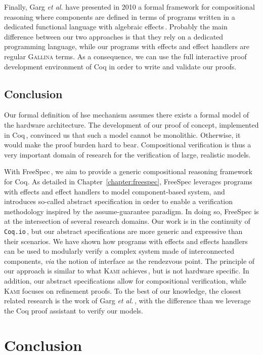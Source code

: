 Finally, Garg \emph{et al.} have presented in 2010 a formal framework for
compositional reasoning where components are defined in terms of programs
written in a dedicated functional language with algebraic
effects\,\cite{garg2010compositional}.
%
Probably the main difference between our two approaches is that they rely on a
dedicated programming language, while our programs with effects and effect
handlers are regular {\scshape Gallina} terms.
%
As a consequence, we can use the full interactive proof development environment
of Coq in order to write and validate our proofs.

\subsection{Conclusion}
\label{subsec:sota:compconclu}

Our formal definition of \ac{hse} mechanism assumes there exists a formal model
of the hardware architecture.
%
The development of our proof of concept, implemented in
Coq\,\cite{letan2016speccertcode}, convinced us that such a model cannot be
monolithic.
%
Otherwise, it would make the proof burden hard to bear.
%
Compositional verification is thus a very important domain of research for the
verification of large, realistic models.

With FreeSpec\,\cite{letan2018freespeccode}, we aim to provide a generic
compositional reasoning framework for Coq.
%
As detailed in Chapter~\ref{chapter:freespec}, FreeSpec leverages programs with
effects and effect handlers to model component-based system, and introduces
so-called abstract specification in order to enable a verification methodology
inspired by the assume-guarantee paradigm.
%
In doing so, FreeSpec is at the intersection of several research domains.
%
Our work is in the continuity of \texttt{Coq.io}\,\cite{claret2015coqio}, but
our abstract specifications are more generic and expressive than their
scenarios.
%
We have shown how programs with effects and effects handlers can be used to
modularly verify a complex system made of interconnected components, \emph{via}
the notion of interface as the rendezvous point.
%
The principle of our approach is similar to what {\scshape Kami}
achieves\,\cite{choi2017kami}, but is not hardware specific.
%
In addition, our abstract specifications allow for compositional verification,
while {\scshape Kami} focuses on refinement proofs.
%
To the best of our knowledge, the closest related research is the work of Garg
\emph{et al.}\,\cite{garg2010compositional}, with the difference than we
leverage the Coq proof assistant to verify our models. 

\section{Conclusion}
\label{sec:sota:conclusion}

